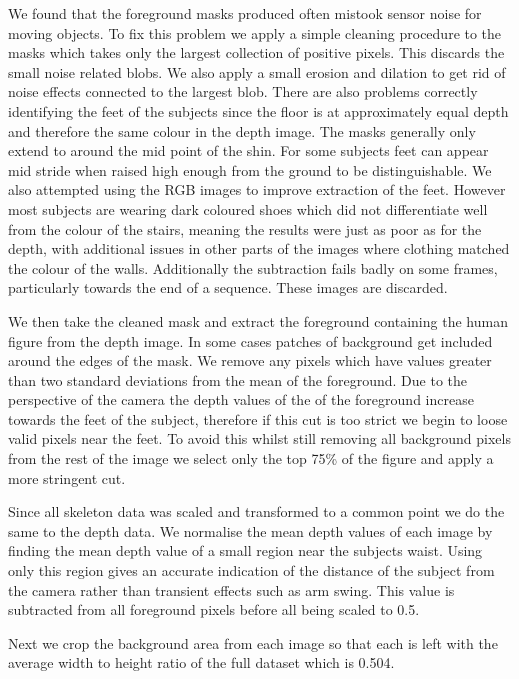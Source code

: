 \documentclass[11pt]{article} %
\begin{document}
We found that the foreground masks produced often mistook sensor noise for moving objects. To fix this problem we apply a simple cleaning procedure to the masks which takes only the largest collection of positive pixels. This discards the small noise related blobs. We also apply a small erosion and dilation to get rid of noise effects connected to the largest blob. There are also problems correctly identifying the feet of the subjects since the floor is at approximately equal depth and therefore the same colour in the depth image. The masks generally only extend to around the mid point of the shin. For some subjects feet can appear mid stride when raised high enough from the ground to be distinguishable. We also attempted using the RGB images to improve extraction of the feet. However most subjects are wearing dark coloured shoes which did not differentiate well from the colour of the stairs, meaning the results were just as poor as for the depth, with additional issues in other parts of the images where clothing matched the colour of the walls. Additionally the subtraction fails badly on some frames, particularly towards the end of a sequence. These images are discarded. 

We then take the cleaned mask and extract the foreground containing the human figure from the depth image. In some cases patches of background get included around the edges of the mask. We remove any pixels which have values greater than two standard deviations from the mean of the foreground. Due to the perspective of the camera the depth values of the of the foreground increase towards the feet of the subject, therefore if this cut is too strict we begin to loose valid pixels near the feet. To avoid this whilst still removing all background pixels from the rest of the image we select only the top 75\% of the figure and apply a more stringent cut. 

Since all skeleton data was scaled and transformed to a common point we do the same to the depth data. We normalise the mean depth values of each image by finding the mean depth value of a small region near the subjects waist. Using only this region gives an accurate indication of the distance of the subject from the camera rather than transient effects such as arm swing. This value is subtracted from all foreground pixels before all being scaled to 0.5. 

Next we crop the background area from each image so that each is left with the average width to height ratio of the full dataset which is 0.504.
\end{document}

